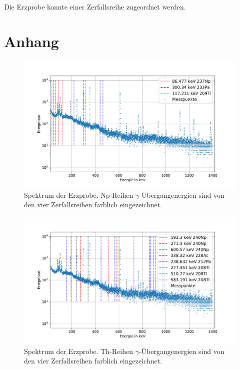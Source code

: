 \documentclass[
	a4paper,
	12pt,
	pagesize,
	ngerman
]{scrartcl}
\begin{document}
	Die Erzprobe konnte einer Zerfallsreihe zugeordnet werden.


	\section{Anhang} \label{s_anhang}

	\begin{figure}[H]
			\includegraphics[width= 1 \linewidth]{img/erz_Np}
			\caption{
			Spektrum der Erzprobe. Np-Reihen $\gamma$-Übergangenergien sind von den vier Zerfallsreihen farblich eingezeichnet.
			}
			\label{fg_erz_np}
	\end{figure}
	\begin{figure}[H]
			\includegraphics[width= 1 \linewidth]{img/erz_Th}
			\caption{
			Spektrum der Erzprobe. Th-Reihen $\gamma$-Übergangenergien sind von den vier Zerfallsreihen farblich eingezeichnet.
			}
			\label{fg_erz_th}
	\end{figure}
\end{document}
